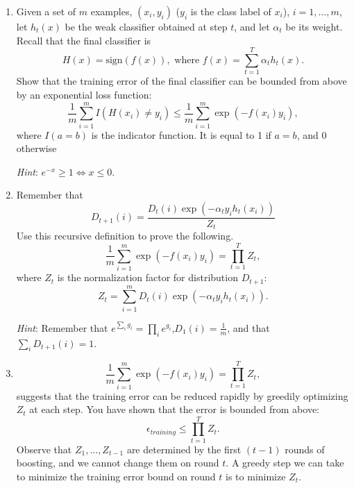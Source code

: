 \documentclass[english]{article}
\begin{document}
\begin{enumerate}
\item Given a set of $m$ examples, $(x_i,y_i)$ ($y_i$ is
  the class label of $x_i$), $i=1,\ldots,m$, let $h_t(x)$ be the weak
  classifier obtained at step $t$, and let $\alpha_t$ be its
  weight. Recall that the final classifier is
  \[
  H(x) = \mbox{sign} (f(x)), \mbox{ where } f(x) = \sum_{t=1}^T
  \alpha_t h_t(x).
  \]
  Show that the training error of the final classifier can be bounded
  from above by an exponential loss function:
  \[
  \frac{1}{m} \sum_{i=1}^m I(H(x_i) \neq y_i) \leq \frac{1}{m}
  \sum_{i=1}^m \exp( -f(x_i) y_i),
  \]
  where $I(a=b)$ is the indicator function. It is equal to 1 if $a=b$,
  and 0 otherwise

  {\em Hint}: $e^{-x} \geq 1 \Leftrightarrow x \leq 0$. 


\item 
  Remember that
  \[D_{t+1}(i)=\frac{D_t(i)\exp(-\alpha_ty_ih_t(x_i))}{Z_t}\] Use this
  recursive definition to prove the following.
  \begin{equation}
    \label{boosting:upper bound} \frac{1}{m} \sum_{i=1}^m \exp( -f(x_i)
    y_i) = \prod_{t=1}^T Z_t,
  \end{equation}
  where $Z_t$ is the normalization factor for distribution $D_{t+1}$:
  \begin{equation}
    \label{boosting:normalization_expression} Z_t = \sum_{i=1}^m D_t(i)
    \exp(-\alpha_t y_i h_t(x_i)).
  \end{equation}

  {\em Hint}: Remember that $e^{\sum_i g_i}=\prod_i
  e^{g_i}$,$D_1(i)=\frac{1}{m}$, and that $\sum_i D_{t+1}(i) = 1$.


\item  \begin{equation} \frac{1}{m} \sum_{i=1}^m \exp( -f(x_i)
    y_i) = \prod_{t=1}^T Z_t,
  \end{equation}
 suggests that the
  training error can be reduced rapidly by greedily optimizing $Z_t$
  at each step.  You have shown that the error is bounded from above:
  \[
  \epsilon_{training} \leq \prod_{t=1}^T Z_t.
  \]
  Observe that $Z_1, \dots, Z_{t-1}$ are determined by the first
  $(t-1)$ rounds of boosting, and we cannot change them on round $t$.
  A greedy step we can take to minimize the training error bound on
  round $t$ is to minimize $Z_t$.


\end{enumerate}
\end{document}

